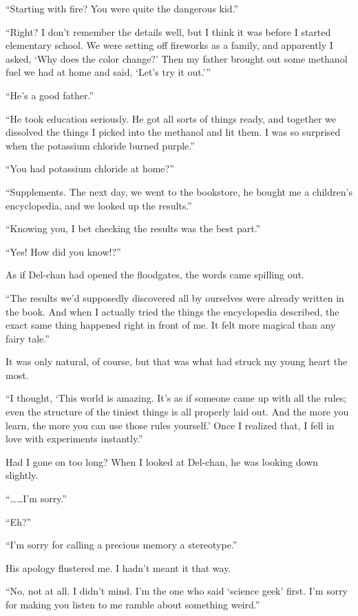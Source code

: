 \documentclass[
    a4paper,
    12pt,
    twoside,
    openany,
    UTF8,
    fontset=windows
]{ctexbook}
\begin{document}
``Starting with fire? You were quite the dangerous kid.''

``Right? I don't remember the details well, but I think it was before I started elementary school. We were setting off fireworks as a family, and apparently I asked, `Why does the color change?' Then my father brought out some methanol fuel we had at home and said, `Let's try it out.'''

``He's a good father.''

``He took education seriously. He got all sorts of things ready, and together we dissolved the things I picked into the methanol and lit them. I was so surprised when the potassium chloride burned purple.''

``You had potassium chloride at home?''

``Supplements. The next day, we went to the bookstore, he bought me a children's encyclopedia, and we looked up the results.''

``Knowing you, I bet checking the results was the best part.''

``Yes! How did you know!?''

As if Del-chan had opened the floodgates, the words came spilling out.

``The results we'd supposedly discovered all by ourselves were already written in the book. And when I actually tried the things the encyclopedia described, the exact same thing happened right in front of me. It felt more magical than any fairy tale.''

It was only natural, of course, but that was what had struck my young heart the most.

``I thought, `This world is amazing. It's as if someone came up with all the rules; even the structure of the tiniest things is all properly laid out. And the more you learn, the more you can use those rules yourself.' Once I realized that, I fell in love with experiments instantly.''

Had I gone on too long? When I looked at Del-chan, he was looking down slightly.

``\dots\dots I'm sorry.''

``Eh?''

``I'm sorry for calling a precious memory a stereotype.''

His apology flustered me. I hadn't meant it that way.

``No, not at all. I didn't mind. I'm the one who said `science geek' first. I'm sorry for making you listen to me ramble about something weird.''
\end{document}
